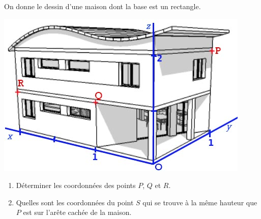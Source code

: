 
On donne le dessin d'une maison dont la base est un rectangle.

\includegraphics[scale=0.5]{RepE-21.jpg} 

\begin{enumerate}
\item Déterminer les coordonnées des points $P$, $Q$ et $R$.
\item Quelles sont les coordonnées du point $S$ qui se trouve à la même hauteur que $P$ est sur l'arête cachée de la maison.
\end{enumerate}
